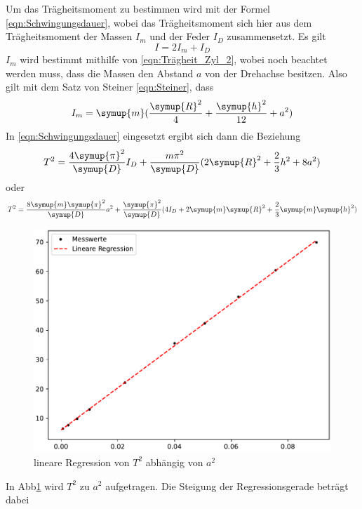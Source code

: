   \noindent Um das Trägheitsmoment zu bestimmen wird mit der Formel \ref{eqn:Schwingungsdauer},
  wobei das Trägheitsmoment sich hier aus dem Trägheitsmoment der Massen $I_m$ und der Feder $I_D$ zusammensetzt. Es gilt
  \begin{equation*}
    I=2I_m+I_D
  \end{equation*}
  $I_m$ wird bestimmt mithilfe von \ref{eqn:Trägheit_Zyl_2}, wobei noch beachtet werden muss, dass die Massen den Abstand $a$ 
  von der Drehachse besitzen. Also gilt mit dem Satz von Steiner \ref{eqn:Steiner}, dass
  \begin{equation*}
    I_m=\symup{m} (\frac{\symup{R}^2}{4}+\frac{\symup{h}^2}{12}+a^2)
  \end{equation*}
  In \ref{eqn:Schwingungsdauer} eingesetzt ergibt sich dann die Beziehung
  \begin{equation*}
    T^2=\frac{4\symup{\pi}^2}{\symup{D}}I_D+\frac{m\pi^2}{\symup{D}} (2\symup{R}^2+\frac{2}{3}h^2+8a^2)
  \end{equation*} 
  oder
  \begin{equation}
    T^2=\frac{8\symup{m}\symup{\pi}^2}{\symup{D}}a^2+\frac{\symup{\pi}^2}{\symup{D}}(4I_D+2\symup{m}\symup{R}^2+\frac{2}{3}\symup{m}\symup{h}^2)
    \label{eqn:Eigenschwing}
  \end{equation} 
    \begin{figure}[H]
    \centering
    \includegraphics[width=\textwidth]{plot.pdf}
    \caption{lineare Regression von $T^2$ abhängig von $a^2$ }
    \label{fig:plot}
  \end{figure}
  \noindent In Abb\ref{fig:plot} wird $T^2$ zu $a^2$ aufgetragen. Die Steigung der Regressionsgerade beträgt dabei 
